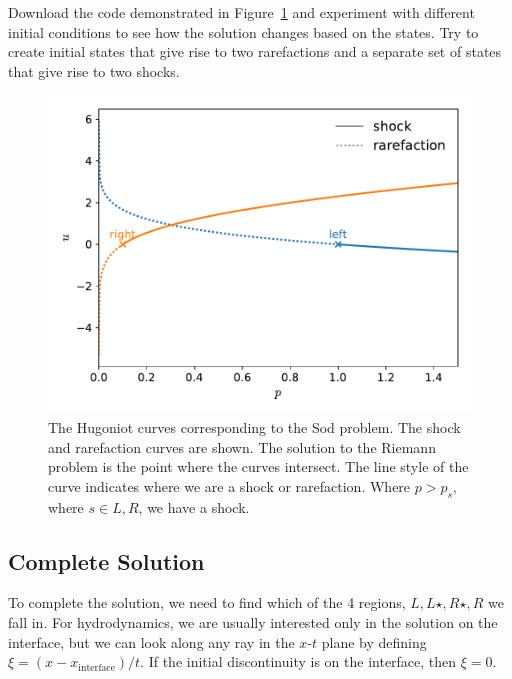 \begin{exercise}
Download the code demonstrated in Figure~\ref{fig:euler:riemann-curve}
and experiment with different initial conditions to see how the
solution changes based on the states.  Try to create initial states
that give rise to two rarefactions and a separate set of states that
give rise to two shocks.
\end{exercise}

\begin{figure}[t]
\centering
\includegraphics[width=0.9\linewidth]{riemann-phase}
\caption[The Hugoniot curves corresponding
to the Sod problem]{\label{fig:euler:riemann-curve} The Hugoniot
curves corresponding to the Sod problem.  The shock and rarefaction
curves are shown.  The solution to the Riemann problem is the point
where the curves intersect.  The line style of the curve indicates
where we are a shock or rarefaction.  Where $p > p_s$, where $s \in {L,R}$, we have a shock.\\
}
\end{figure}


\subsection{Complete Solution}

To complete the solution, we need to find which of the 4 regions, $L,
L\star, R\star, R$ we fall in.  For hydrodynamics, we are usually
interested only in the solution on the interface, but we can look
along any ray in the $x$-$t$ plane by defining $\xi = (x -
x_\mathrm{interface})/t$.  If the initial discontinuity is on the
interface, then $\xi = 0$.

